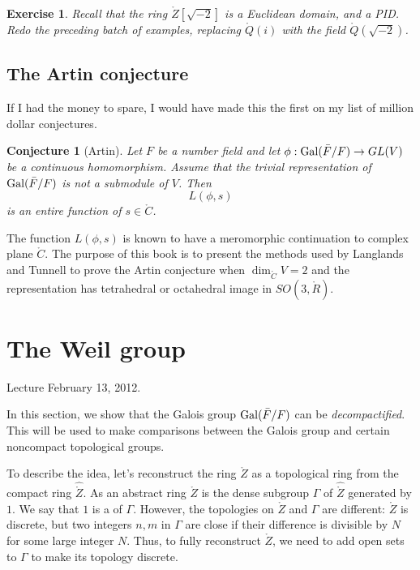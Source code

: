 \documentclass{amsart}
\newtheorem{conjecture}[equation]{Conjecture}
\newtheorem{exercise}{Exercise}
\begin{document}
\begin{exercise} Recall that the ring $\ring{Z}[\sqrt{-2}]$ is a
  Euclidean domain, and a PID.  Redo the preceding batch of examples,
  replacing $\ring{Q}(i)$ with the field $\ring{Q}(\sqrt{-2})$.
\end{exercise}

\subsection{The Artin conjecture}

If I had the money to spare, I would have made this the first on my
list of million dollar conjectures.

\begin{conjecture}[Artin] Let $F$ be a number field and let
  $\phi:{\operatorname{Gal}}(\bar F/F)\to GL(V)$ be a continuous homomorphism.
  Assume that the trivial representation of ${\operatorname{Gal}}(\bar F/F)$ is
  not a submodule of $V$.  Then
\[
L(\phi,s)
\]
is an entire function of $s\in \ring{C}$.
\end{conjecture}

The function $L(\phi,s)$ is known to have a meromorphic continuation
to complex plane $\ring{C}$.  The purpose of this book is to
present the methods used by Langlands and Tunnell to prove the Artin
conjecture when $\dim_{\ring{C}}V = 2$ and the representation has
tetrahedral or octahedral image in $SO(3,\ring{R})$.

\newpage

\section{The Weil group}

Lecture February 13, 2012.

In this section, we show that the Galois group ${\operatorname{Gal}}(\bar F/F)$ can
be {\it decompactified}.  This will be used to make comparisons between
the Galois group and certain noncompact topological groups.  

To describe
the idea, let's reconstruct the ring $\ring{Z}$ as a topological ring
from the compact ring $\hat{\ring{Z}}$.  As an abstract ring $\ring{Z}$
is the dense subgroup $\Gamma$ of $\hat{\ring{Z}}$ generated by
$1$.  We say that $1$ is a  of $\Gamma$.
However, the topologies on $\ring{Z}$ and $\Gamma$ are different:
$\ring{Z}$ is discrete, but two integers $n,m$ in $\Gamma$ are close
if their difference is divisible by $N$ for some large integer $N$.
Thus, to fully reconstruct $\ring{Z}$, we need to add open sets to $\Gamma$
to make its topology discrete.
\end{document}

